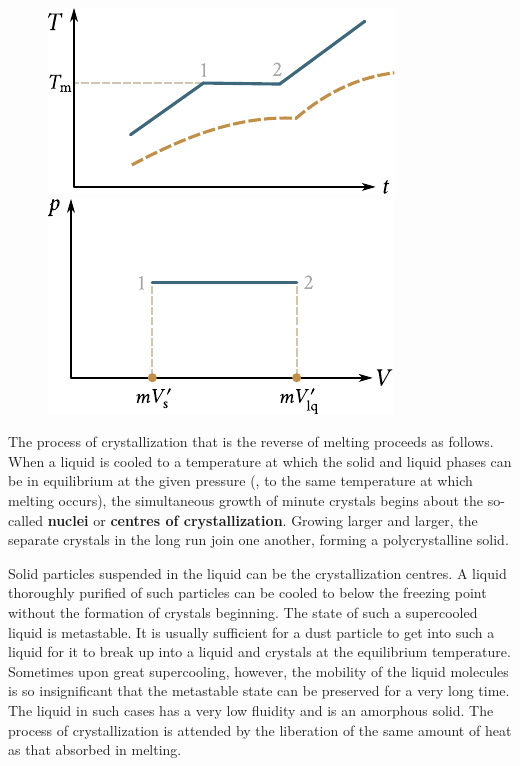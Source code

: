 \begin{figure}[t]
	\begin{minipage}[t]{0.5\linewidth}
		\begin{center}
			\includegraphics[scale=1]{figures/ch_15/fig_15_13.pdf}
			\caption[]{}
			\label{fig:15_13}
		\end{center}
	\end{minipage}
	\hspace{-0.05cm}
	\begin{minipage}[t]{0.5\linewidth}
		\begin{center}
			\includegraphics[scale=1]{figures/ch_15/fig_15_14.pdf}
			\caption[]{}
			\label{fig:15_14}
		\end{center}
	\end{minipage}
	\vspace{-0.4cm}
\end{figure}

The process of crystallization that is the reverse of melting proceeds as follows. When a liquid is cooled to a temperature at which the solid and liquid phases can be in equilibrium at the given pressure (\ie, to the same temperature at which melting occurs), the simultaneous growth of minute crystals begins about the so-called \textbf{nuclei} or \textbf{centres of crystallization}. Growing larger and larger, the separate crystals in the long run join one another, forming a polycrystalline solid.

Solid particles suspended in the liquid can be the crystallization centres. A liquid thoroughly purified of such particles can be cooled to below the freezing point without the formation of crystals beginning. The state of such a supercooled liquid is metastable. It is usually sufficient for a dust particle to get into such a liquid for it to break up into a liquid and crystals at the equilibrium temperature. Sometimes upon great supercooling, however, the mobility of the liquid molecules is so insignificant that the metastable state can be preserved for a very long time. The liquid in such cases has a very low fluidity and is an amorphous solid. The process of crystallization is attended by the liberation of the same amount of heat as that absorbed in melting.

